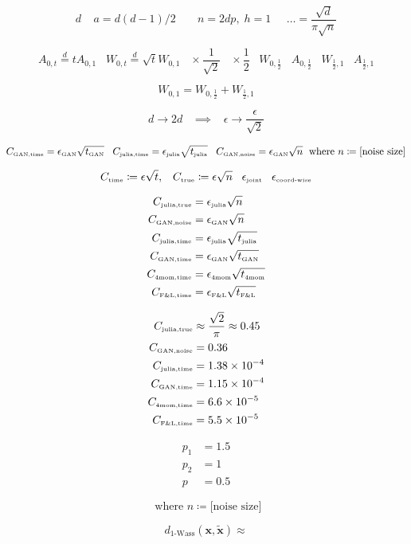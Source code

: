 \documentclass[a4paper,11pt]{article}
\renewcommand{\tilde}{\widetilde}
\begin{document}
\[
d \;\;\;\; a = d(d-1)/2  \;\;\;\;\;\;\; n=2dp, \; h = 1  \;\;\;\;\; \ldots = \frac{\sqrt{d}}{\pi \sqrt{n}}
\]

\[
A_{0,t} \overset{d}{=} t A_{0,1} \;\;\; W_{0,t} \overset{d}{=} \sqrt{t} W_{0,1} \;\;\; \times \frac{1}{\sqrt{2}} \;\;\; \times \frac{1}{2} \;\;\; W_{0,\frac{1}{2}} \;\;\; A_{0,\frac{1}{2}} \;\;\; W_{\frac{1}{2}, 1} \;\;\; A_{\frac{1}{2}, 1}
\]

\[
W_{0,1} = W_{0,\frac{1}{2}} + W_{\frac{1}{2}, 1}
\]

\[
d \rightarrow 2d \;\;\; \implies \;\;\; \epsilon \rightarrow \frac{\epsilon}{\sqrt{2}}
\]

\[
C_{\text{\tiny GAN,time}} = \epsilon_{\text{\tiny GAN}} \sqrt{t_{\text{\tiny GAN}}}  \;\;\; C_{\text{\tiny julia,time}} = \epsilon_{\text{\tiny julia}} \sqrt{t_{\text{\tiny julia}}}  \;\;\; C_{\text{\tiny GAN,noise}} = \epsilon_{\text{\tiny GAN}} \sqrt{n} \;\text{ where } n \coloneqq \text{[noise size]}
\]

\[
C_{\text{\tiny time}} \coloneqq \epsilon \sqrt{t}, \;\;\; C_{\text{\tiny true}} \coloneqq \epsilon \sqrt{n} \;\;\; \epsilon_{\text{\tiny joint}} \;\;\; \epsilon_{\text{\tiny coord-wise}}
\]

\begin{align}
    C_{\text{\tiny julia,true}} &= \epsilon_{\text{\tiny julia}} \sqrt{n} \\
    C_{\text{\tiny GAN,noise}} &= \epsilon_{\text{\tiny GAN}} \sqrt{n} \\
	C_{\text{\tiny julia,time}} &= \epsilon_{\text{\tiny julia}} \sqrt{t_{\text{\tiny julia}}} \\
    C_{\text{\tiny GAN,time}} &= \epsilon_{\text{\tiny GAN}} \sqrt{t_{\text{\tiny GAN}}} \\
    C_{\text{\tiny 4mom,time}} &= \epsilon_{\text{\tiny 4mom}} \sqrt{t_{\text{\tiny 4mom}}} \\
    C_{\text{\tiny F\&L,time}} &= \epsilon_{\text{\tiny F\&L}} \sqrt{t_{\text{\tiny F\&L}}} \\
\end{align}

\begin{align}
	C_{\text{\tiny julia,true}} &\approx \frac{\sqrt{2}}{\pi} \approx 0.45 \\
    C_{\text{\tiny GAN,noise}} &= 0.36 \\
	C_{\text{\tiny julia,time}} &= 1.38 \times 10^{-4} \\
    C_{\text{\tiny GAN,time}} &= 1.15 \times 10^{-4} \\
    C_{\text{\tiny 4mom,time}} &= 6.6 \times 10^{-5} \\
    C_{\text{\tiny F\&L,time}} &=  5.5 \times 10^{-5}
\end{align}

\begin{align}
	p_1 &= 1.5 \\
	p_2 &= 1 \\
	p &= 0.5
\end{align}

\[
\text{ where } n \coloneqq \text{[noise size]}
\]

\[
d_{\text{1-Wass}}({\boldsymbol x}, \tilde{{\boldsymbol x}}) \approx
\]
\end{document}
